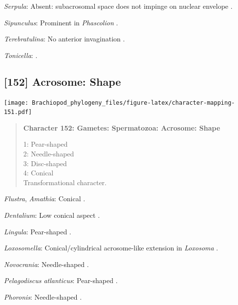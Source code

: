 \documentclass[openany]{book}
\begin{document}
\hypertarget{Serpula-coding-151}{}
\emph{Serpula}: Absent: subacrosomal space does not impinge on nuclear
envelope \citep{Gherardi2011}.

\hypertarget{Sipunculus-coding-151}{}
\emph{Sipunculus}: Prominent in \emph{Phascolion} \citep{Rice1993}.

\hypertarget{Terebratulina-coding-151}{}
\emph{Terebratulina}: No anterior invagination
\citep{Hodgson1994Ultrastructureof}.

\hypertarget{Tonicella-coding-151}{}
\emph{Tonicella}: \citet{BucklandNicks1988}.

\subsection*{{[}152{]} Acrosome: Shape}\label{acrosome-shape}

\texttt{[image: Brachiopod\_phylogeny\_files/figure-latex/character-mapping-151.pdf]}

\begin{quote}
\textbf{Character 152: Gametes: Spermatozoa: Acrosome: Shape}

1: Pear-shaped\\
2: Needle-shaped\\
3: Disc-shaped\\
4: Conical\\
Transformational character.
\end{quote}

\hypertarget{Amathia-coding-152}{}
\emph{Flustra}, \emph{Amathia}: Conical \citep[in
\emph{Tubulipora};][]{Franzen1984}.

\hypertarget{Dentalium-coding-152}{}
\emph{Dentalium}: Low conical aspect \citep{DufresneDube1983}.

\hypertarget{Lingula-coding-152}{}
\emph{Lingula}: Pear-shaped \citep{Fukumoto2003Theacrosome}.

\hypertarget{Loxosomella-coding-152}{}
\emph{Loxosomella}: Conical/cylindrical acrosome-like extension in
\emph{Loxosoma} \citep{Franzen2000}.

\hypertarget{Novocrania-coding-152}{}
\emph{Novocrania}: Needle-shaped \citep{Afzelius1978Finestructure}.

\hypertarget{Pelagodiscus_atlanticus-coding-152}{}
\emph{Pelagodiscus atlanticus}: Pear-shaped
\citep{Hodgson1994Ultrastructureof}.

\hypertarget{Phoronis-coding-152}{}
\emph{Phoronis}: Needle-shaped \citep{Reunov2004Ultrastructuralstudy}.
\end{document}
